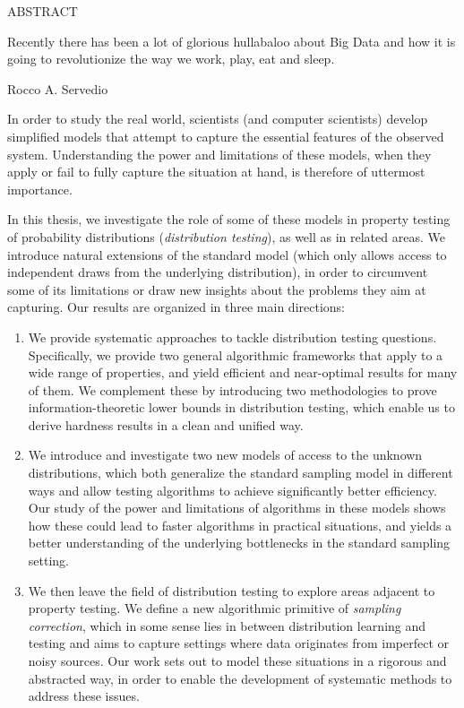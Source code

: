 
\pagestyle{empty} %
\begin{center}
  ABSTRACT

  \@title

  \@author
\end{center}

\epigraph{Recently there has been a lot of glorious hullabaloo about Big Data and how it is going to revolutionize the way we work, play, eat and sleep.}{Rocco A. Servedio}

In order to study the real world, scientists (and computer scientists) develop simplified models that attempt to capture the essential features of the observed system.
Understanding the power and limitations of these models, when they apply or fail to fully capture the situation at hand, is therefore of uttermost importance.

In this thesis, we investigate the role of some of these models in property testing of probability distributions (\emph{distribution testing}), as well as in related areas. We introduce natural extensions of the standard
model (which only allows access to independent draws from the underlying distribution), in order to circumvent some of its limitations or draw new insights about the
problems they aim at capturing. Our results are organized in three main directions:

\begin{enumerate}
  \item We provide systematic approaches to tackle distribution testing questions. Specifically, we provide two general algorithmic frameworks that apply to a wide range of properties, and yield efficient and near-optimal results for many of them. We complement these by introducing two methodologies to prove information-theoretic lower bounds in distribution testing, which enable us to derive hardness results in a clean and unified way.
  
  \item We introduce and investigate two new models of access to the unknown distributions, which both generalize the standard sampling model in different ways and allow testing algorithms to achieve significantly better efficiency. Our study of the power and limitations of algorithms in these models shows how these could lead to faster algorithms in practical situations, and  yields a better understanding of the underlying bottlenecks in the standard sampling setting.

  \item We then leave the field of distribution testing to explore areas adjacent to property testing. We define a new algorithmic primitive of \emph{sampling correction}, which in some sense lies in between distribution learning and testing and aims to capture settings where data originates from imperfect or noisy sources. Our work sets out to model these situations in a rigorous and abstracted way, in order to enable the development of systematic methods to address these issues.
\end{enumerate}
